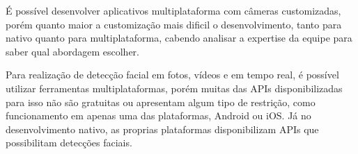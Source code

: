 É possível desenvolver aplicativos multiplataforma com câmeras customizadas, porém quanto maior a customização mais dificil o
 desenvolvimento, tanto para nativo quanto para multiplataforma, cabendo analisar a expertise da equipe para saber qual 
 abordagem escolher.

Para realização de detecção facial em fotos, vídeos e em tempo real, é possível utilizar ferramentas multiplataformas, 
porém muitas das APIs disponibilizadas para isso não são gratuitas ou apresentam algum tipo de restrição, como funcionamento
em apenas uma das plataformas, Android ou iOS. Já no desenvolvimento nativo, as proprias plataformas disponibilizam APIs 
que possibilitam detecções faciais.

